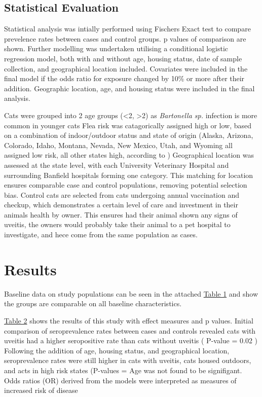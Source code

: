 \documentclass[11pt,twocolumn]{article}
\begin{document}
	\newpage
	\subsection{Statistical Evaluation}

		Statistical analysis was intially performed using Fischers Exact test to compare prevelence rates between cases and control groups. p values of comparison are shown.
		Further modelling was undertaken utilising a conditional logistic regression model, both with and without age, housing status, date of sample collection, and geographical location included. 
		Covariates were included in the final model if the odds ratio for exposure changed by 10\% or more after their addition.
		Geographic location, age, and housing status were included in the final analysis.


		Cats were grouped into 2 age groups (\textless 2, \textgreater 2) as \emph{Bartonella sp.} infection is more common in younger cats
		Flea risk was catagorically assigned high or low, based on a combination of indoor/outdoor status and state of origin (Alaska, Arizona, Colorado, Idaho, Montana, Nevada, New Mexico, Utah, and Wyoming all assigned low risk, all other states high, according to \cite{Jameson1995a})
		Geographical location was assessed at the state level, with each University Veterinary Hospital and surrounding Banfield hospitals forming one category.
		This matching for location ensures comparable case and control populations, removing potential selection bias. 
		Control cats are selected from cats undergoing annual vaccination and checkup, which demonstrates a certain level of care and investment in their animals health by owner. This ensures had their animal shown any signs of uveitis, the owners would probably take their animal to a pet hospital to investigate, and hece come from the same population as cases.


		\newpage
\section{Results}


		Baseline data on study populations can be seen in the attached \hyperref[tab:1]{Table 1} and show the groups are comparable on all baseline characteristics.


		\hyperref[tab:2]{Table 2} shows the results of this study with effect measures and p values. 
		Initial comparison of seroprevalence rates between cases and controls revealed cats with uveitis had a higher seropositive rate than cats without uveitis ( P-value = 0.02 ) 
		Following the addition of age, housing status, and geographical location, seroprevalence rates were still higher in cats with uveitis, cats housed outdoors, and acts in high risk states (P-values = 
		Age was not found to be signifigant.
		Odds ratios (OR) derived from the models were interpreted as measures of increased risk of disease
\end{document}
